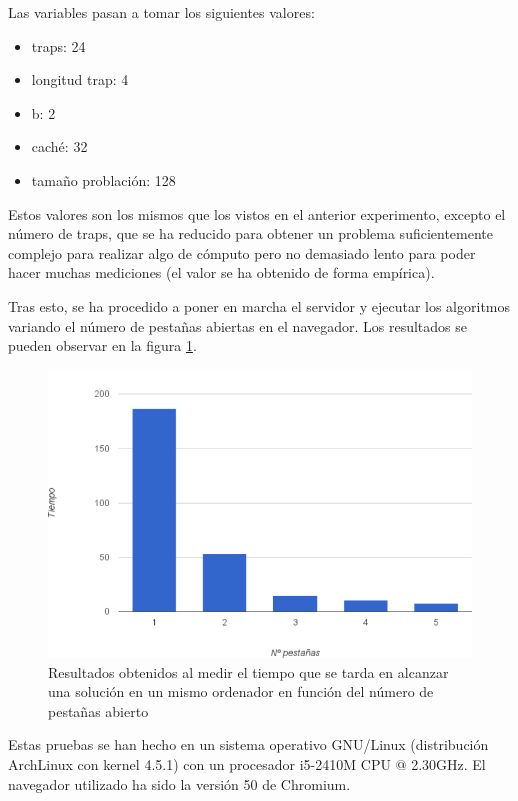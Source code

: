 \documentclass[runningheads,a4paper]{llncs}
\begin{document}
Las variables pasan a tomar los siguientes valores:
\begin{itemize}
  \item traps: 24
  \item longitud trap: 4
  \item b: 2
  \item cach\'e: 32
  \item tama\~no problaci\'on: 128
\end{itemize}

Estos valores son los mismos que los vistos en el anterior experimento, excepto
el n\'umero de traps, que se ha reducido para obtener un problema suficientemente
complejo para realizar algo de c\'omputo pero no demasiado lento para poder hacer
muchas mediciones (el valor se ha obtenido de forma emp\'irica).

Tras esto, se ha procedido a poner en marcha el servidor y ejecutar los algoritmos
variando el n\'umero de pesta\~nas abiertas en el navegador. Los resultados
se pueden observar en la figura \ref{tiempo-pestanas}.

\begin{figure}[htbp]
\includegraphics[scale=0.6]{img/tiempo-pestanas}
\centering
\caption{Resultados obtenidos al medir el tiempo que se tarda en alcanzar una
soluci\'on en un mismo ordenador en funci\'on del n\'umero de pesta\~nas abierto}
\label{tiempo-pestanas}
\end{figure}

Estas pruebas se han hecho en un sistema operativo GNU/Linux (distribuci\'on ArchLinux con
kernel 4.5.1) con un procesador i5-2410M CPU @ 2.30GHz. El navegador utilizado ha sido la
versi\'on 50 de Chromium.
\end{document}
